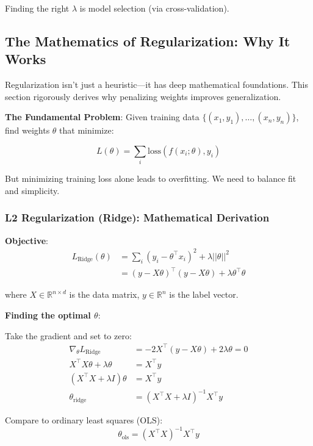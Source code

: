 Finding the right $\lambda$ is model selection (via cross-validation).

\subsection{The Mathematics of Regularization: Why It Works}

Regularization isn't just a heuristic—it has deep mathematical foundations. This section rigorously derives why penalizing weights improves generalization.

\textbf{The Fundamental Problem}: Given training data $\{(x_1, y_1), \ldots, (x_n, y_n)\}$, find weights $\theta$ that minimize:

\begin{equation}
L(\theta) = \sum_{i} \text{loss}(f(x_i; \theta), y_i)
\end{equation}

But minimizing training loss alone leads to overfitting. We need to balance fit and simplicity.

\subsubsection{L2 Regularization (Ridge): Mathematical Derivation}

\textbf{Objective}:
\begin{align}
L_{\text{Ridge}}(\theta) &= \sum_{i} (y_i - \theta^\top x_i)^2 + \lambda||\theta||^2 \\
&= (y - X\theta)^\top(y - X\theta) + \lambda\theta^\top\theta
\end{align}

where $X \in \mathbb{R}^{n \times d}$ is the data matrix, $y \in \mathbb{R}^n$ is the label vector.

\textbf{Finding the optimal $\theta$}:

Take the gradient and set to zero:
\begin{align}
\nabla_\theta L_{\text{Ridge}} &= -2X^\top(y - X\theta) + 2\lambda\theta = 0 \\
X^\top X\theta + \lambda\theta &= X^\top y \\
(X^\top X + \lambda I)\theta &= X^\top y \\
\theta_{\text{ridge}} &= (X^\top X + \lambda I)^{-1} X^\top y
\end{align}

Compare to ordinary least squares (OLS):
\begin{equation}
\theta_{\text{ols}} = (X^\top X)^{-1} X^\top y
\end{equation}

